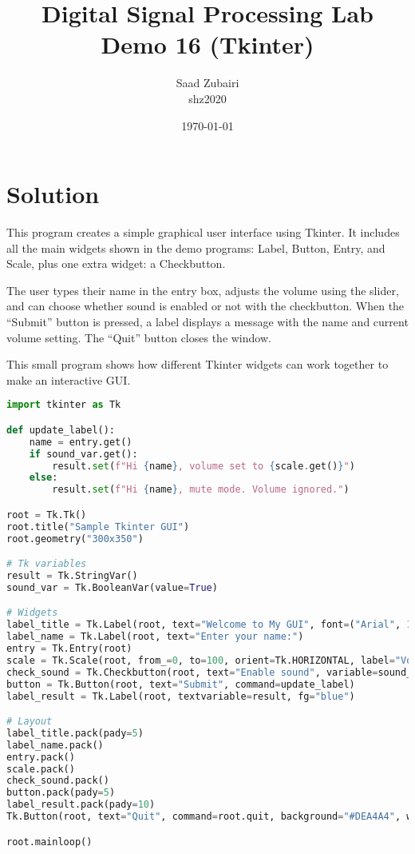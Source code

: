 \documentclass[11pt]{article}
\title{
    \vspace{3em}
    \textbf{Digital Signal Processing Lab}\\
    Demo 16 (Tkinter)
    \vspace{1em}
}
\author{
    Saad Zubairi \\ 
    shz2020 \\
    \vspace{1em}
}
\date{\today}
\begin{document}
\maketitle	

\pagebreak



\section*{Solution}

This program creates a simple graphical user interface using Tkinter.
It includes all the main widgets shown in the demo programs: Label, Button, Entry, and Scale, plus one extra widget: a Checkbutton.

The user types their name in the entry box, adjusts the volume using the slider, and can choose whether sound is enabled or not with the checkbutton. When the “Submit” button is pressed, a label displays a message with the name and current volume setting. The “Quit” button closes the window.

This small program shows how different Tkinter widgets can work together to make an interactive GUI.


\begin{lstlisting}[language=python, label={lst:code}, breaklines=true]
import tkinter as Tk

def update_label():
    name = entry.get()
    if sound_var.get():
        result.set(f"Hi {name}, volume set to {scale.get()}")
    else:
        result.set(f"Hi {name}, mute mode. Volume ignored.")

root = Tk.Tk()
root.title("Sample Tkinter GUI")
root.geometry("300x350")

# Tk variables
result = Tk.StringVar()
sound_var = Tk.BooleanVar(value=True)

# Widgets
label_title = Tk.Label(root, text="Welcome to My GUI", font=("Arial", 14, "bold"))
label_name = Tk.Label(root, text="Enter your name:")
entry = Tk.Entry(root)
scale = Tk.Scale(root, from_=0, to=100, orient=Tk.HORIZONTAL, label="Volume")
check_sound = Tk.Checkbutton(root, text="Enable sound", variable=sound_var)
button = Tk.Button(root, text="Submit", command=update_label)
label_result = Tk.Label(root, textvariable=result, fg="blue")

# Layout
label_title.pack(pady=5)
label_name.pack()
entry.pack()
scale.pack()
check_sound.pack()
button.pack(pady=5)
label_result.pack(pady=10)
Tk.Button(root, text="Quit", command=root.quit, background="#DEA4A4", width=5).pack(fill=Tk.X)

root.mainloop()
\end{lstlisting}    
    
\end{document}
